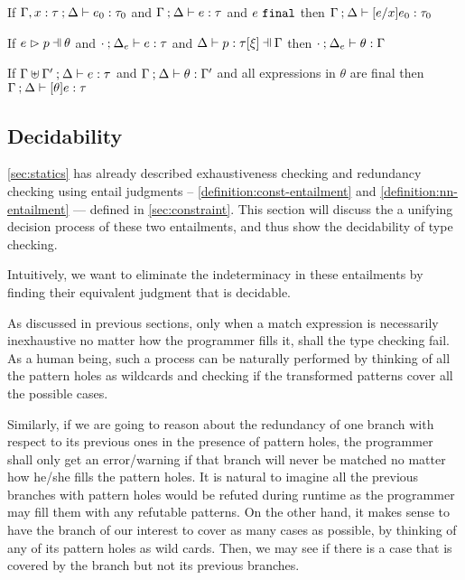 \begin{lemma}[Substitution]
  \label{lemma:substitution}
  If $\Gamma, x : \tau \mathbin{;} \Delta \vdash e_0 : \tau_0$ and $\Gamma \mathbin{;} \Delta \vdash e : \tau$ and $e ~\mathtt{final}$
  then $\Gamma \mathbin{;} \Delta \vdash [e/x]e_0 : \tau_0$
\end{lemma}

\begin{lemma}
  \label{lemma:subs-typing}
  If $\hpatmatch{e}{p}{\theta}$ and $\cdot \mathbin{;} \Delta_e \vdash e : \tau$ and $\chpattyp{p}{\tau}{\xi}{\Gamma}{\Delta}$ then $\cdot \mathbin{;} \Delta_e \vdash \theta : \Gamma$
\end{lemma}

\begin{lemma}
  \label{lemma:simult-substitution}
  If $\Gamma \uplus \Gamma' \mathbin{;} \Delta \vdash e : \tau$ and $\Gamma \mathbin{;} \Delta \vdash \theta : \Gamma'$ and all expressions in $\theta$ are final
  then $\Gamma \mathbin{;} \Delta \vdash [\theta]e : \tau$
\end{lemma}

\subsection{Decidability}\label{sec:algorithm}

\autoref{sec:statics} has already described exhaustiveness checking and redundancy checking using entail judgments -- \autoref{definition:const-entailment} and
\autoref{definition:nn-entailment} --- defined in \autoref{sec:constraint}. 
This section will discuss the a unifying decision process of these two entailments,
and thus show the decidability of type checking. 

Intuitively, we want to eliminate the indeterminacy in these entailments by finding their equivalent judgment that  is decidable.

As discussed in previous sections, only when a match expression is necessarily inexhaustive no matter how the programmer fills it, shall the type checking fail. As a human being, such a process can be naturally performed by thinking of all the pattern holes as wildcards and checking if the transformed patterns cover all the possible cases. 

Similarly, if we are going to reason about the redundancy of one branch with respect to its previous ones in the presence of pattern holes, the programmer shall only get an error/warning if that branch will never be matched no matter how he/she fills the pattern holes. It is natural to imagine all the previous branches with pattern holes would be refuted during runtime as the programmer may fill them with any refutable patterns. On the other hand, it makes sense to have the branch of our interest to cover as many cases as possible, by thinking of any of its pattern holes as wild cards. Then, we may see if there is a case that is covered by the branch but not its previous branches.

